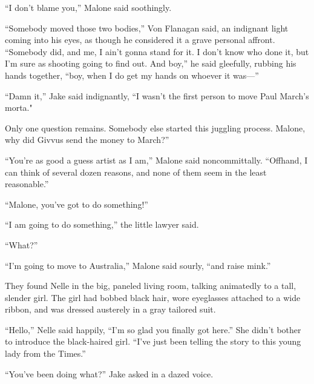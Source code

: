 \documentclass{novel}
\begin{document}
“I don’t blame you,” Malone said soothingly.

“Somebody moved those two bodies,” Von Flanagan said, an indignant light coming into his eyes, as though he considered it a grave personal affront. “Somebody did, and me, I ain’t gonna stand for it. I don’t know who done it, but I’m sure as shooting going to find out. And boy,” he said gleefully, rubbing his hands together, “boy, when I do get my hands on whoever it was—”

\vspace{2\nbs}
\clearpage
\thispagestyle{empty}

\begin{ChapterStart}
\vspace{3\nbs}
\end{ChapterStart}

“Damn it,” Jake said indignantly, “I wasn’t the first person to move Paul March’s morta."

Only one question remains. Somebody else started this juggling process. Malone, why did Givvus send the money to March?”

“You’re as good a guess artist as I am,” Malone said noncommittally. “Offhand, I can think of several dozen reasons, and none of them seem in the least reasonable.”

“Malone, you’ve got to do something!”

“I am going to do something,” the little lawyer said.

“What?”

“I’m going to move to Australia,” Malone said sourly, “and raise mink.”

They found Nelle in the big, paneled living room, talking animatedly to a tall, slender girl. The girl had bobbed black hair, wore eyeglasses attached to a wide ribbon, and was dressed austerely in a gray tailored suit.

“Hello,” Nelle said happily, “I’m so glad you finally got here.” She didn’t bother to introduce the black-haired girl. “I've just been telling the story to this young lady from the Times.”

“You’ve been doing what?” Jake asked in a dazed voice.
\end{document}
